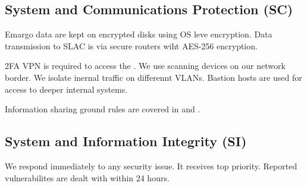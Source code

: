 \subsection{System and Communications Protection (SC)} \label{sec:SC}
Emargo data are kept on encrypted disks using OS leve encryption.
Data transmission to SLAC is via  secure routers wiht AES-256 encryption.

2FA VPN is required to access the \PZ.
We use scanning devices on our network border.
We isolate inernal traffic on differennt VLANs.
Bastion hosts are used for access to deeper internal systems.

Information sharing ground rules are  covered in  and .

\subsection{ System and Information Integrity (SI)} \label{sec:SI}
We respond immediately to any security issue.
It receives top priority.
Reported vulnerabilites are dealt with within 24 hours.


